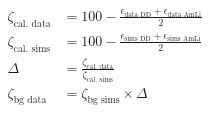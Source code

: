 \begin{align}
    \zeta_{\textrm{cal. data}} &= 100 - \frac{\epsilon_{\textrm{data DD}} +\epsilon_{\textrm{data AmLi}}}{2} \\
    \zeta_{\textrm{cal. sims}} &= 100 - \frac{\epsilon_{\textrm{sims DD}} + \epsilon_{\textrm{sims AmLi}}}{2} \\
    \Delta &= \frac{\zeta_{\textrm{cal. data}}}{\zeta_{\textrm{cal. sims}}} \\
    \zeta_{\textrm{bg data}} &= \zeta_{\textrm{bg sims}} \times \Delta 
    \label{eq:efficiency_option3} 
\end{align}
